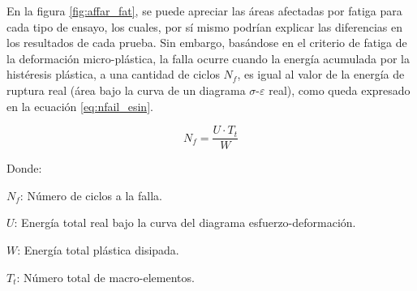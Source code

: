 En la figura \ref{fig:affar_fat}, se puede apreciar las áreas afectadas por fatiga para cada tipo de ensayo, los cuales, por sí mismo podrían explicar las diferencias en los resultados de cada prueba. Sin embargo, basándose en el criterio de fatiga de la deformación micro-plástica, la falla ocurre cuando la energía acumulada por la histéresis plástica, a una cantidad de ciclos $N_f$, es igual al valor de la energía de ruptura real (área bajo la curva de un diagrama $\sigma$-$\varepsilon$ real), como queda expresado en la ecuación \ref{eq:nfail_esin}.

\begin{equation}\label{eq:nfail_esin}
	N_f = \frac{U \cdot T_t}{W} 
\end{equation}

Donde:
\begin{itemize*}
	\item $N_f$: Número de ciclos a la falla.
	\item $U$: Energía total real bajo la curva del diagrama esfuerzo-deformación.
	\item $W$: Energía total plástica disipada.
	\item $T_t$: Número total de macro-elementos.
\end{itemize*}

